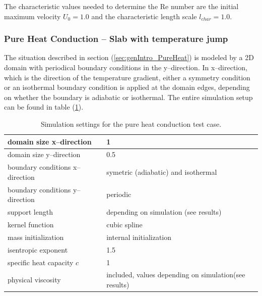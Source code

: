 \documentclass{report}
\begin{document}
The characteristic values needed to determine the Re number are the initial maximum  velocity $U_0=1.0$ and the characteristic length scale $l_\mathit{char}=1.0$.


\subsubsection{Pure Heat Conduction -- Slab with temperature jump}
\label{sec:simuSetup_PureHeat}

The situation described in section (\ref{sec:genIntro_PureHeat}) is modeled by a 2D domain with periodical boundary conditions in the y--direction. In x--direction, which is the direction of the temperature gradient, either a symmetry condition or an isothermal boundary condition is applied at the domain edges, depending on whether the boundary is adiabatic or isothermal. The entire simulation setup can be found in table (\ref{tab:SimuSettings_PureHeat}).

\begin{table}[h] %
\label{tab:SimuSettings_PureHeat}
\centering

\begin{tabular}[c]{|l|p{5cm}|} %
\hline
\hline
domain size x--direction &  1\\
\hline
domain size y--direction &  0.5\\
\hline
boundary conditions x--direction & symetric (adiabatic) and isothermal\\
\hline
boundary conditions y--direction & periodic\\
\hline
support length & depending on simulation \newline (see results)  \\
\hline
kernel function & cubic spline \\
\hline
mass initialization & internal initialization \\
\hline
isentropic exponent & 1.5\\
\hline
specific heat capacity  $c$ & 1 \\
\hline
physical viscosity& included, values depending on simulation\newline (see results)\\ 
\hline
\hline
\end{tabular}
\caption[]{Simulation settings for the pure heat conduction test case.}

\end{table}
\end{document}
